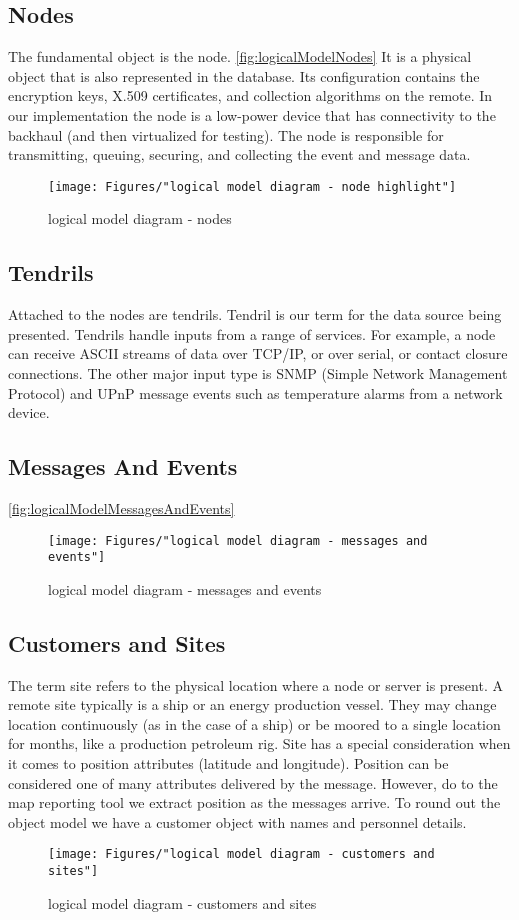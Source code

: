 \subsection{Nodes}
The fundamental object is the node. \autoref{fig:logicalModelNodes} It is a physical object that is also represented in the database.  Its configuration contains the encryption keys, X.509 certificates, and collection algorithms on the remote.  In our implementation the node is a low-power device that has connectivity to the backhaul (and then virtualized for testing).  The node is responsible for transmitting, queuing, securing, and collecting the event and message data.  
\begin{figure}
\centering
\texttt{[image: Figures/"logical model diagram - node highlight"]}
\caption{logical model diagram - nodes}
\label{fig:logicalModelNodes}
\end{figure}

\subsection{Tendrils}
Attached to the nodes are tendrils. Tendril is our term for the data source being presented.  Tendrils handle inputs from a range of services. For example, a node can receive ASCII streams of data over TCP/IP, or over serial, or contact closure connections. The other major input type is SNMP (Simple Network Management Protocol) and UPnP message events such as temperature alarms from a network device. 

\subsection{Messages And Events}
\autoref{fig:logicalModelMessagesAndEvents}
 \begin{figure}
 \centering
 \texttt{[image: Figures/"logical model diagram - messages and events"]}
 \caption{logical model diagram - messages and events}
 \label{fig:logicalModelMessagesAndEvents}
 \end{figure}

\subsection{Customers and Sites}
The term site refers to the physical location where a node or server is present. A remote site typically is a ship or an energy production vessel. They may change location continuously (as in the case of a ship) or be moored to a single location for months, like a production petroleum rig.  Site has a special consideration when it comes to position attributes (latitude and longitude).  Position can be considered one of many attributes delivered by the message.  However, do to the map reporting tool we extract position as the messages arrive.  To round out the object model we have a customer object with names and personnel details.
\begin{figure}
\centering
\texttt{[image: Figures/"logical model diagram - customers and sites"]}
\caption{logical model diagram - customers and sites}
\label{fig:logicalModelCustomersAndSites}
\end{figure}
 
